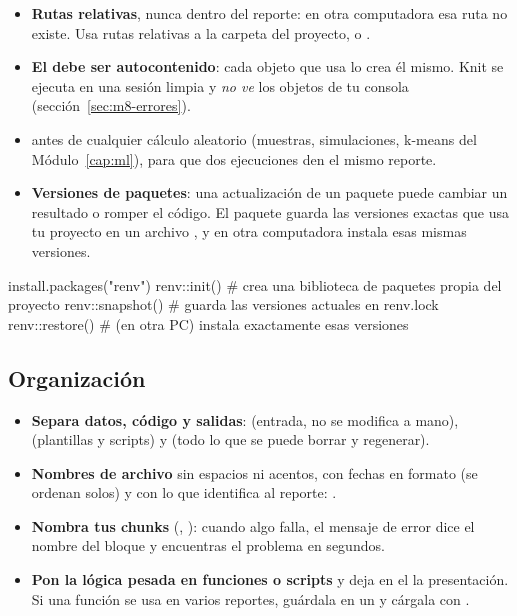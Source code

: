 \begin{itemize}
  \item \textbf{Rutas relativas}, nunca 
        dentro del reporte: en otra computadora esa ruta no existe. Usa
        rutas relativas a la carpeta del proyecto, 
        o .
  \item \textbf{El  debe ser autocontenido}: cada objeto que
        usa lo crea él mismo. Knit se ejecuta en una sesión limpia y
        \emph{no ve} los objetos de tu consola (sección~\ref{sec:m8-errores}).
  \item \textbf{} antes de cualquier cálculo aleatorio
        (muestras, simulaciones, k-means del Módulo~\ref{cap:ml}), para que
        dos ejecuciones den el mismo reporte.
  \item \textbf{Versiones de paquetes}: una actualización de un paquete
        puede cambiar un resultado o romper el código. El paquete
         guarda las versiones exactas que usa tu proyecto en un
        archivo , y en otra computadora
         instala esas mismas versiones.
\end{itemize}

\begin{rnoejecutar}
install.packages("renv")
renv::init()       # crea una biblioteca de paquetes propia del proyecto
renv::snapshot()   # guarda las versiones actuales en renv.lock
renv::restore()    # (en otra PC) instala exactamente esas versiones
\end{rnoejecutar}

\subsection{Organización}

\begin{itemize}
  \item \textbf{Separa datos, código y salidas}:  (entrada,
        no se modifica a mano),  (plantillas y scripts) y
         (todo lo que se puede borrar y regenerar).
  \item \textbf{Nombres de archivo} sin espacios ni acentos, con fechas en
        formato  (se ordenan solos) y con lo que
        identifica al reporte: .
  \item \textbf{Nombra tus chunks} (,
        ): cuando algo falla, el mensaje de error
        dice el nombre del bloque y encuentras el problema en segundos.
  \item \textbf{Pon la lógica pesada en funciones o scripts} y deja en el
         la presentación. Si una función se usa en varios
        reportes, guárdala en un  y cárgala con
        .
\end{itemize}

